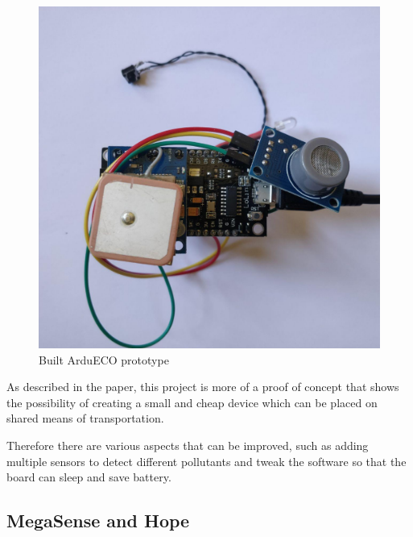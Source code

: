 			\noindent
			\begin{minipage}{0.38\textwidth}
				\begin{figure}[H]
					\centering
					\includegraphics[width=\textwidth]{resources/img/ardueco_picture}
					\caption{Built ArduECO prototype}
					\label{img:ardueco_picture}
				\end{figure}
			\end{minipage}%
			\hfill%
			\begin{minipage}{0.6\textwidth}\raggedright
				As described in the paper, this project is more of a proof of concept that shows the possibility of creating a small and cheap device which can be placed on shared means of transportation.
				
				Therefore there are various aspects that can be improved, such as adding multiple sensors to detect different pollutants and tweak the software so that the board can sleep and save battery.
			\end{minipage}

		\subsection{MegaSense and Hope}
	
	
